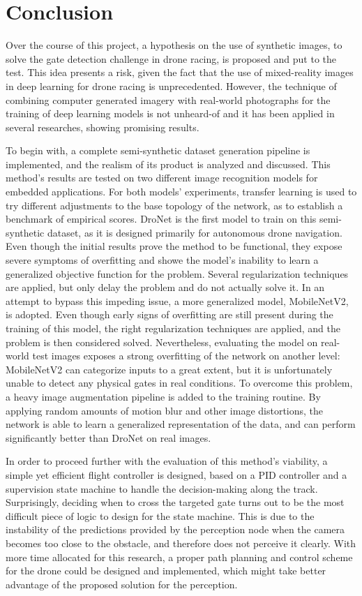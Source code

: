 \chapter{Conclusion}

Over the course of this project, a hypothesis on the use of synthetic images,
to solve the gate detection challenge in drone racing, is proposed and put
to the test. This idea presents a risk, given the fact that the use of
mixed-reality images in deep learning for drone racing is unprecedented.
However, the technique of combining computer generated imagery with real-world
photographs for the training of deep learning models is not unheard-of and it
has been applied in several researches, showing promising results.

To begin with, a complete semi-synthetic dataset generation pipeline is
implemented, and the realism of its product is analyzed and discussed.
This method's results are tested on two different image recognition models for
embedded applications.
For both models' experiments, transfer learning is used to try
different adjustments to the base topology of the network, as to establish a
benchmark of empirical scores.
DroNet is the first model to train on this semi-synthetic dataset, as it is
designed primarily for autonomous drone navigation. Even though the initial
results prove the method to be functional, they expose severe symptoms of
overfitting and showe the model's inability to learn a generalized objective
function for the problem. Several regularization techniques are applied, but
only delay the problem and do not actually solve it. In an attempt to bypass
this impeding issue, a more generalized model, MobileNetV2, is adopted. Even
though early signs of overfitting are still present during the training of
this model, the right regularization techniques are applied, and the problem is
then considered solved. Nevertheless, evaluating the model on real-world test
images exposes a strong overfitting of the network on another level:
MobileNetV2 can categorize inputs to a great extent, but it is unfortunately
unable to detect any physical gates in real conditions. To overcome this
problem, a heavy image augmentation pipeline is added to the training routine.
By applying random amounts of motion blur and other image distortions, the
network is able to learn a generalized representation of the data, and can
perform significantly better than DroNet on real images.

In order to proceed further with the evaluation of this method's viability, a
simple yet efficient flight controller is designed, based on a PID controller
and a supervision state machine to handle the decision-making along the track. 
Surprisingly, deciding when to cross the targeted gate turns out to be the
most difficult piece of logic to design for the state machine. This is due to
the instability of the predictions provided by the perception node when the
camera becomes too close to the obstacle, and therefore does not perceive it
clearly. With more time allocated for this research, a proper path planning
and control scheme for the drone could be designed and implemented, which might
take better advantage of the proposed solution for the perception.

